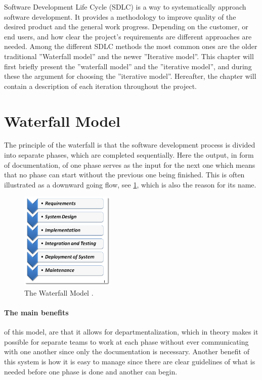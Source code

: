 Software Development Life Cycle (SDLC) is a way to systematically approach software development.
It provides a methodology to improve quality of the desired product and the general work progress. 
Depending on the customer, or end users, and how clear the project's requirements are different approaches are needed. 
Among the different SDLC methods the most common ones are the older traditional ''Waterfall model'' and the newer ''Iterative model''. \cite{SDLC-Toolsqa}
This chapter will first briefly present the ''waterfall model'' and the ''iterative model'', and during these the argument for choosing the ''iterative model''.
Hereafter, the chapter will contain a description of each iteration throughout the project.


\section{Waterfall Model}\label{sec:WaterfallModel}
The principle of the waterfall \cite{Waterfall-Toolsqa} is that the software development process is divided into separate phases, which are completed sequentially.
Here the output, in form of documentation, of one phase serves as the input for the next one which means that no phase can start without the previous one being finished.
This is often illustrated as a downward going flow, see \cref{fig:Waterfall}, which is also the reason for its name.

\begin{figure}[H]
	\centering
	\includegraphics[width=0.4\textwidth]{billeder/WaterFall-Model.png}
	\caption{The Waterfall Model \cite{Waterfall-Toolsqa}.}\label{fig:Waterfall}
\end{figure}

\paragraph{The main benefits} of this model, are that it allows for departmentalization, which in theory makes it possible for separate teams to work at each phase without ever communicating with one another since only the documentation is necessary.
Another benefit of this system is how it is easy to manage since there are clear guidelines of what is needed before one phase is done and another can begin.

